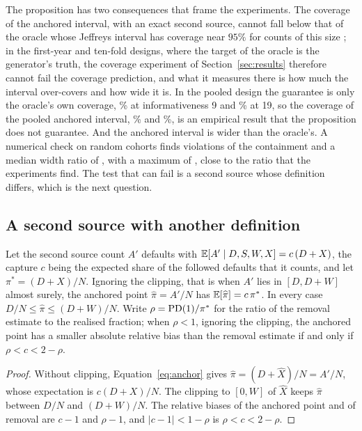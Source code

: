 The proposition has two consequences that frame the experiments. The coverage of the anchored interval, with an exact second source, cannot fall below that of the oracle whose Jeffreys interval has coverage near $95\%$ for counts of this size \citep{brown2001}; in the first-year and ten-fold designs, where the target of the oracle is the generator's truth, the coverage experiment of Section~\ref{sec:results} therefore cannot fail the coverage prediction, and what it measures there is how much the interval over-covers and how wide it is. In the pooled design the guarantee is only the oracle's own coverage, \% at informativeness 9 and \% at 19, so the coverage of the pooled anchored interval, \% and \%, is an empirical result that the proposition does not guarantee. And the anchored interval is wider than the oracle's. A numerical check on  random cohorts finds  violations of the containment and a median width ratio of , with a maximum of , close to the ratio that the experiments find. The test that can fail is a second source whose definition differs, which is the next question.

\subsection{A second source with another definition}

\begin{proposition}
\label{prop:capture}
Let the second source count $A'$ defaults with $\mathbb{E}[A'\mid D,S,W,X]=c\,(D+X)$, the capture $c$ being the expected share of the followed defaults that it counts, and let $\pi^{\ast}=(D+X)/N$. Ignoring the clipping, that is when $A'$ lies in $[D,D+W]$ almost surely, the anchored point $\widehat\pi=A'/N$ has $\mathbb{E}[\widehat\pi]=c\,\pi^{\ast}$. In every case $D/N\le\widehat\pi\le(D+W)/N$. Write $\rho=\mathrm{PD}(1)/\pi^{\ast}$ for the ratio of the removal estimate to the realised fraction; when $\rho<1$, ignoring the clipping, the anchored point has a smaller absolute relative bias than the removal estimate if and only if $\rho<c<2-\rho$.
\end{proposition}
\begin{proof}
Without clipping, Equation~\eqref{eq:anchor} gives $\widehat\pi=(D+\widehat X)/N=A'/N$, whose expectation is $c(D+X)/N$. The clipping to $[0,W]$ of $\widehat X$ keeps $\widehat\pi$ between $D/N$ and $(D+W)/N$. The relative biases of the anchored point and of removal are $c-1$ and $\rho-1$, and $|c-1|<1-\rho$ is $\rho<c<2-\rho$.
\end{proof}

